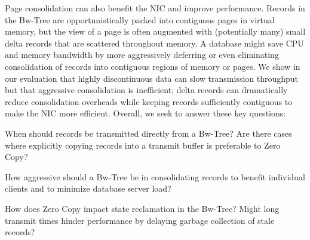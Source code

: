Page consolidation can also benefit the NIC and improve performance.  Records
in the Bw-Tree are opportunistically packed into contiguous pages in virtual
memory, but the view of a page is often augmented with (potentially many)
small delta records that are scattered throughout memory.
A database might save CPU and memory bandwidth by more
aggressively deferring or even eliminating consolidation of records into
contiguous regions of memory or pages. We show in
our evaluation that highly discontinuous data can slow
transmission throughput but that aggressive consolidation is inefficient; delta
records can dramatically reduce consolidation overheads while keeping records
sufficiently contiguous to make the NIC more efficient.
Overall, we seek to answer these key questions:
\begin{myitemize}
\item
When should records be transmitted directly from a Bw-Tree? Are there cases
where explicitly copying records into a transmit buffer is preferable to Zero Copy?
\item
How aggressive should a Bw-Tree be in consolidating records to benefit individual
clients and to minimize database server load?
\item
How does Zero Copy impact state reclamation in the Bw-Tree? Might long transmit
times hinder performance by delaying garbage collection of stale records?
\end{myitemize}










